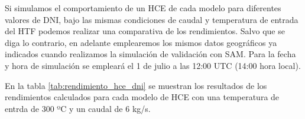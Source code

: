 Si simulamos el comportamiento de un HCE de cada modelo para  diferentes valores de DNI, bajo las mismas condiciones de caudal y temperatura de entrada del HTF podemos realizar una comparativa de los rendimientos. Salvo que se diga lo contrario, en adelante emplearemos los mismos datos geográficos ya indicados cuando realizamos la simulación de validación con SAM. Para la fecha y hora de simulación se empleará el 1 de julio a las 12:00 UTC (14:00 hora local).

En la tabla \ref{tab:rendimiento_hce_dni} se muestran los resultados de los rendimientos calculados para cada modelo de HCE con una temperatura de entrda de 300 ºC y un caudal de 6 kg/s.
\begin{table}[h!]
\centering
\caption{Rendimiento en función de la radiación normal incidente para  distintos modelos de HCE}
\label{tab:rendimiento_hce_dni}
\end{table}

